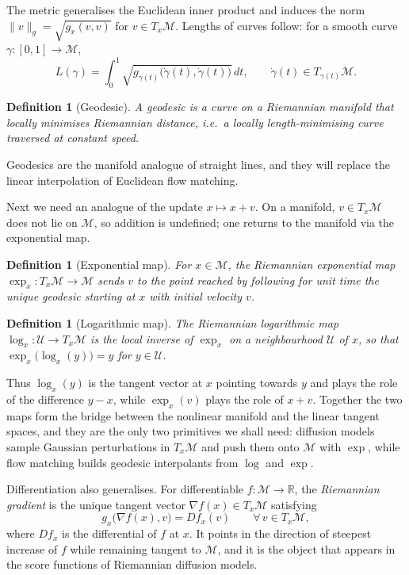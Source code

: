\documentclass[a4paper,12pt]{article}
\newtheorem{definition}[theorem]{Definition}
\theoremstyle{remark}
\begin{document}
The metric generalises the Euclidean inner product and induces the norm
$\|v\|_g=\sqrt{g_x(v,v)}$ for $v\in T_x\mathcal M$. Lengths of curves follow: for a
smooth curve $\gamma:[0,1]\rightarrow\mathcal M$,
\[
L(\gamma)
=
\int_0^1
\sqrt{g_{\gamma(t)}\bigl(\dot\gamma(t),\dot\gamma(t)\bigr)}\,dt,
\qquad
\dot\gamma(t)\in T_{\gamma(t)}\mathcal M .
\]

\begin{definition}[Geodesic]
\label{def:geodesic}
A \emph{geodesic} is a curve on a Riemannian manifold that locally minimises
Riemannian distance, i.e.\ a locally length-minimising curve traversed at constant
speed.
\end{definition}

Geodesics are the manifold analogue of straight lines, and they will replace the
linear interpolation of Euclidean flow matching.

Next we need an analogue of the update $x\mapsto x+v$. On a manifold, $v\in T_x\mathcal M$
does not lie on $\mathcal M$, so addition is undefined; one returns to the manifold via
the exponential map.

\begin{definition}[Exponential map]
\label{def:exp}
For $x\in\mathcal M$, the Riemannian exponential map
$\exp_x:T_x\mathcal M\rightarrow\mathcal M$ sends $v$ to the point reached by following
for unit time the unique geodesic starting at $x$ with initial velocity $v$.
\end{definition}

\begin{definition}[Logarithmic map]
\label{def:log}
The Riemannian logarithmic map $\log_x:\mathcal U\rightarrow T_x\mathcal M$ is the local
inverse of $\exp_x$ on a neighbourhood $\mathcal U$ of $x$, so that
$\exp_x\bigl(\log_x(y)\bigr)=y$ for $y\in\mathcal U$.
\end{definition}

Thus $\log_x(y)$ is the tangent vector at $x$ pointing towards $y$ and plays the role
of the difference $y-x$, while $\exp_x(v)$ plays the role of $x+v$. Together the two
maps form the bridge between the nonlinear manifold and the linear tangent spaces, and
they are the only two primitives we shall need: diffusion models sample Gaussian
perturbations in $T_x\mathcal M$ and push them onto $\mathcal M$ with $\exp$, while flow
matching builds geodesic interpolants from $\log$ and $\exp$.

Differentiation also generalises. For differentiable $f:\mathcal M\rightarrow\mathbb R$,
the \emph{Riemannian gradient} is the unique tangent vector
$\nabla f(x)\in T_x\mathcal M$ satisfying
\[
g_x\bigl(\nabla f(x),v\bigr)=Df_x(v)
\qquad\forall\,v\in T_x\mathcal M ,
\]
where $Df_x$ is the differential of $f$ at $x$. It points in the direction of steepest
increase of $f$ while remaining tangent to $\mathcal M$, and it is the object that appears
in the score functions of Riemannian diffusion models.
\end{document}
